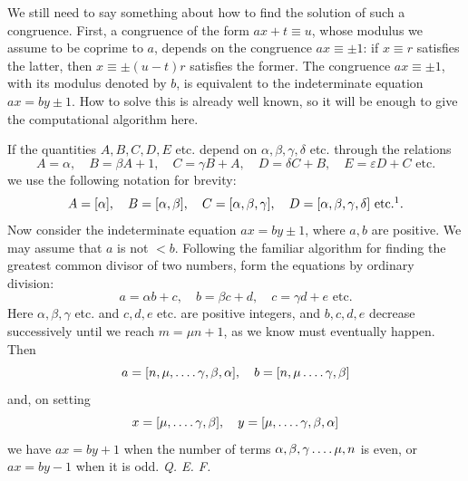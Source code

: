 
We still need to say something about how to find the solution of such a congruence. First, a congruence of the form $ax+t \equiv u$, whose modulus we assume to be coprime to $a$, depends on the congruence $ax \equiv \pm 1$: if $x \equiv r$ satisfies the latter, then $x \equiv \pm(u-t)r$ satisfies the former. The congruence $ax \equiv \pm 1$, with its modulus denoted by $b$, is equivalent to the indeterminate equation $ax = by \pm 1$. How to solve this is already well known, so it will be enough to give the computational algorithm here.

If the quantities $A, B, C, D, E$ etc. depend on $\alpha, \beta, \gamma, \delta$ etc. through the relations
\[
A = \alpha, \quad B = \beta A + 1, \quad C = \gamma B + A, \quad D = \delta C + B, \quad
E = \varepsilon D + C \text{ etc.}
\]
we use the following notation for brevity:
\begingroup
\renewcommand{\thefootnote}{*)}
\[
A = [\alpha], \quad B = [\alpha, \beta], \quad C = [\alpha, \beta, \gamma], \quad
D = [\alpha, \beta, \gamma, \delta] \text{ etc.}\footnotemark.
\]
\endgroup
Now consider the indeterminate equation $ax = by \pm 1$, where $a, b$ are positive. We may assume that $a$ is not $< b$. Following the familiar algorithm for finding the greatest common divisor of two numbers, form the equations by ordinary division:
\[
a = \alpha b + c, \quad b = \beta c + d, \quad c = \gamma d + e \text{ etc.}
\]
Here $\alpha, \beta, \gamma$ etc. and $c, d, e$ etc. are positive integers, and $b, c, d, e$ decrease successively until we reach $m = \mu n + 1$,
as we know must eventually happen. Then
\[
a=[n,\mu,\mathinner{\ldotp\ldotp\ldotp\ldotp} \gamma,\beta,\alpha], \quad b=[n,\mu\mathinner{\ldotp\ldotp\ldotp\ldotp} \gamma,\beta]
\]
and, on setting
\[
x=[\mu,\mathinner{\ldotp\ldotp\ldotp\ldotp} \gamma,\beta], \quad y=[\mu,\mathinner{\ldotp\ldotp\ldotp\ldotp} \gamma,\beta,\alpha]
\]
we have $ax=by+1$ when the number of terms $\alpha,\beta,\gamma\mathinner{\ldotp\ldotp\ldotp\ldotp} \mu,n$ is even, or $ax=by-1$ when it is odd. \emph{Q. E. F.}

